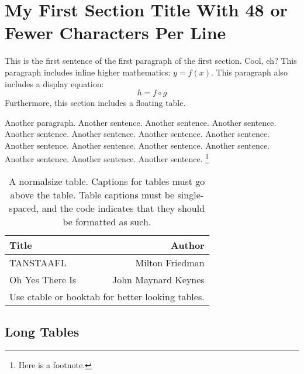 \documentclass[12pt,econ]{sources/authesis}
\theoremstyle{definition}
\theoremstyle{definition}
\theoremstyle{definition}
\theoremstyle{remark}
\begin{document}
\section{\texorpdfstring{My First Section Title \newline With 48 or
Fewer Characters Per
Line}{My First Section Title With 48 or Fewer Characters Per Line}}\label{introduction-first-section}

This is the first sentence of the first paragraph of the first section.
Cool, eh? This paragraph includes inline higher mathematics: \(y=f(x)\).
This paragraph also includes a display equation:
\begin{equation}
h = f \circ g
\end{equation}
Furthermore, this section includes a floating table.

Another paragraph. Another sentence. Another sentence. Another sentence.
Another sentence. Another sentence. Another sentence. Another sentence.
Another sentence. Another sentence. Another sentence. Another sentence.
Another sentence. Another sentence. Another sentence. \footnote{
Here is a footnote.}
\begin{table}[h]\centering
\caption{A normalsize table.
Captions for tables must go above the table.
Table captions must be single-spaced,
and the code indicates that they should be formatted as such.}
\begin{tabular}{lr}\hline\hline
Title & Author \\ \hline
TANSTAAFL & Milton Friedman \\
Oh Yes There Is & John Maynard Keynes \\ \hline
\multicolumn{2}{c}{\small Use ctable or booktab for better looking tables.}
\end{tabular}
\end{table}
\subsection{Long Tables}\label{long-tables}
\end{document}
